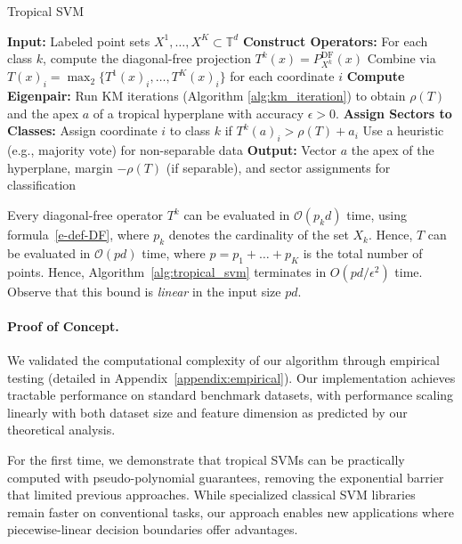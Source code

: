 \documentclass{article}
\newcommand{\trop}{\mathbb{T}}
\begin{document}
\begin{algorithm}
\caption{Tropical SVM}\label{alg:tropical_svm}
\begin{algorithmic}[1]
\STATE \textbf{Input:} Labeled point sets $X^1,\dots,X^K \subset \trop^d$
\STATE \textbf{Construct Operators:}
  \STATE \quad For each class $k$, compute the diagonal-free projection $T^k(x) = P^{\textrm{DF}}_{X^k}(x)$
  \STATE \quad Combine via $T(x)_i = \operatorname{\max}_2\{T^1(x)_i, \dots, T^K(x)_i\}$ for each coordinate $i$
\STATE \textbf{Compute Eigenpair:}
  \STATE \quad Run KM iterations (Algorithm \ref{alg:km_iteration}) to obtain $\rho(T)$ and the apex $a$ of a tropical hyperplane with accuracy $\epsilon>0$.
\STATE \textbf{Assign Sectors to Classes:}
    \STATE Assign coordinate $i$ to class $k$ if $T^k(a)_i > \rho(T) + a_i$
  \ELSE
    \STATE Use a heuristic (e.g., majority vote) for non-separable data
  \ENDIF
\STATE \textbf{Output:} Vector $a$ the apex of the hyperplane, margin $-\rho(T)$ (if separable), and sector assignments for classification
\end{algorithmic}
\end{algorithm}
Every diagonal-free operator $T^k$ can be evaluated in $\mathcal{O}(p_k d)$ time, using formula~\eqref{e-def-DF},
where $p_k$ denotes the cardinality of the set $X_k$. Hence, $T$ can be evaluated in
$\mathcal{O}(pd)$ time, where $p=p_1+\dots+p_K$ is the total number of points.
Hence, Algorithm~\ref{alg:tropical_svm} terminates in $O(pd/\epsilon^2)$ time. Observe
that this bound is {\em linear} in the input size $pd$.

\paragraph{Proof of Concept.}
We validated the computational complexity of our algorithm through empirical testing (detailed in Appendix~\ref{appendix:empirical}). Our implementation achieves tractable performance on standard benchmark datasets, with performance scaling linearly with both dataset size and feature dimension as predicted by our theoretical analysis.

For the first time, we demonstrate that tropical SVMs can be practically computed with pseudo-polynomial guarantees, removing the exponential barrier that limited previous approaches. While specialized classical SVM libraries remain faster on conventional tasks, our approach enables new applications where piecewise-linear decision boundaries offer advantages.
\end{document}
